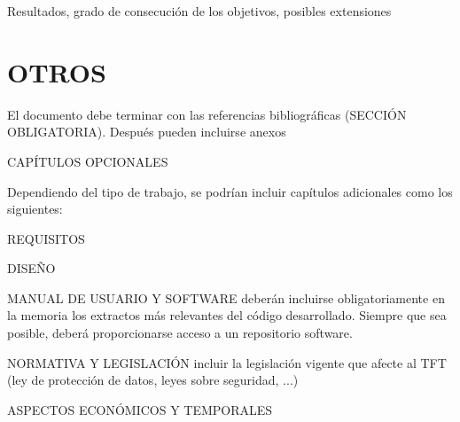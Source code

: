 \documentclass[oneside,12pt]{book}
\begin{document}
Resultados,  grado  de  consecución  de  los  objetivos,  posibles extensiones

\chapter{OTROS}

El documento debe terminar con las referencias bibliográficas (SECCIÓN OBLIGATORIA). Después pueden incluirse anexos 

CAPÍTULOS OPCIONALES

Dependiendo del tipo de trabajo, se podrían incluir capítulos adicionales como los siguientes:

\begin{description}
\item{REQUISITOS}
\item{DISEÑO}
\item{MANUAL  DE  USUARIO  Y  SOFTWARE}  deberán  incluirse  obligatoriamente  en  la  memoria  los extractos más relevantes   del código desarrollado. Siempre que sea posible, deberá   proporcionarse acceso a un repositorio software.
\item{NORMATIVA Y LEGISLACIÓN} incluir la legislación vigente que afecte al TFT (ley de protección de datos, leyes sobre seguridad, ...)
\item{ASPECTOS ECONÓMICOS Y TEMPORALES}
\end{description}





\end{document}
